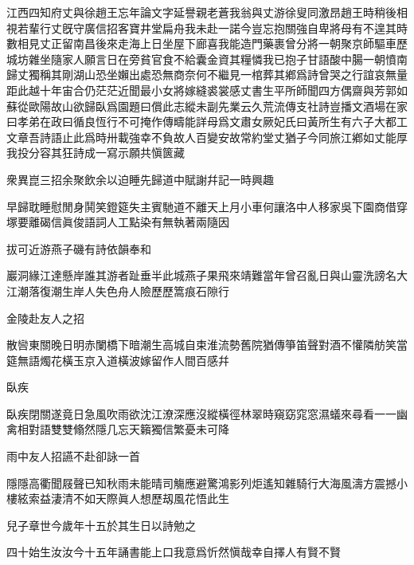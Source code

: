 \documentclass{zhvt-classic-Miya}
\begin{document}
江西四知府丈與徐趙王忘年論文字延譽親老蒼我翁與丈游徐叟同激昂趙王時稍後相視若輩行丈旣守廣信招客寶井堂扁舟我未赴一諾今豈忘抱關強自卑將母有不遑其時數相見丈正留南昌後來走海上日坐屋下廊喜我能造門藥裹曾分將一朝聚京師驅車歷城坊雜坐隨家人願言日在旁貧官食不給囊金資其糧憐我已抱子甘語酸中腸一朝憤南歸丈獨稱其剛湖山恐坐嬾出處恐無商奈何不繼見一棺葬其鄕爲詩曾哭之行誼哀無量距此越十年宙合仍茫茫近聞最小女將嫁縫裘裳感丈書生平所師聞四方偶齋與芳郭如蘇從歐陽故山欲歸臥爲園題曰償此志縱未副先業云久荒流傳支社詩豈播文酒場在家曰孝弟在政曰循良恆行不可掩作傳疇能詳母爲文肅女厥妃氏曰黃所生有六子大都工文章吾詩語止此爲時卅載強幸不負故人百變安故常約堂丈猶子今同旅江鄕如丈能厚我投分容其狂詩成一寫示願共愼篋藏

\begin{fw}衆異崑三招余聚飲余以迫睡先歸道中賦謝幷記一時興趣\end{fw}

早歸耽睡慰閒身鬨笑鐙筵失主賓馳道不離天上月小車何讓洛中人移家吳下園商借穿塚要離碣信眞俊語詞人工點染有無執著兩隨因

\begin{fw}拔可近游燕子磯有詩依韻奉和\end{fw}

巖洞緣江達懸岸誰其游者趾垂半此城燕子果飛來靖難當年曾召亂日與山靈洗謗名大江潮落復潮生岸人失色舟人險歷歷篙痕石隙行

\begin{fw}金陵赴友人之招\end{fw}

散㘘東關晚日明赤闌橋下暗潮生高城自束淮流勢舊院猶傳箏笛聲對酒不懽隣舫笑當筵無語燭花橫玉京入道橫波嫁留作人間百感幷

\begin{fw}臥疾\end{fw}

臥疾閉關遂竟日急風吹雨欲沈江潦深應沒縱橫徑林翠時窺窈窕窓濕蟻來尋看一一幽禽相對語雙雙翛然隱几忘天籟獨信繁憂未可降

\begin{fw}雨中友人招讌不赴卻詠一首\end{fw}

隱隱高衢聞屐聲已知秋雨未能晴司觴應避驚鴻影列炬遙知雜騎行大海風濤方震撼小樓絃索益淒清不如天際眞人想歷刼風花悟此生

\begin{fw}兒子章世今歲年十五於其生日以詩勉之\end{fw}

四十始生汝汝今十五年誦書能上口我意爲忻然愼哉幸自擇人有賢不賢
\end{document}
